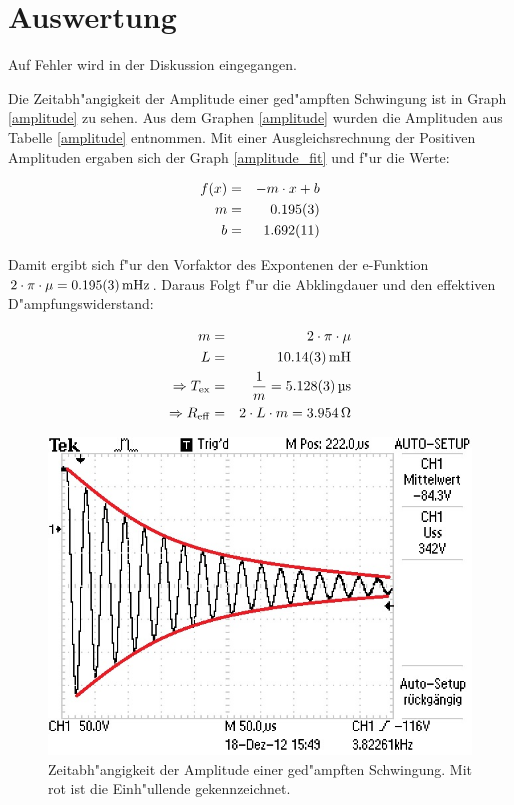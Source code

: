 \section{Auswertung}
	\label{sec:auswertung}
	

	Auf Fehler wird in der Diskussion eingegangen.

	Die Zeitabh"angigkeit der Amplitude einer ged"ampften Schwingung ist in Graph \eqref{amplitude} zu sehen.
	Aus dem Graphen \eqref{amplitude} wurden die Amplituden aus Tabelle \eqref{amplitude} entnommen. Mit einer Ausgleichsrechnung der Positiven Amplituden ergaben sich der Graph \eqref{amplitude_fit} und f"ur die Werte:

	\begin{eqnarray}
		f(x) &=& -m \cdot x + b\\ \label{ausgleich}
		m &=& \SI{0.195 (3)}{} \nonumber\\
		b &=& \SI{1.692 (11)}{}\nonumber 
	\end{eqnarray}

	Damit ergibt sich f"ur den Vorfaktor des Expontenen der e-Funktion $2\cdot \pi \cdot \mu  = \SI{0.195 (3)}{\milli\hertz}$.
	Daraus Folgt f"ur die Abklingdauer und den effektiven D"ampfungswiderstand:

	\begin{eqnarray*}
		m &=& 2 \cdot \pi \cdot \mu\\
		L &=& \SI{10.14 (3)}{\milli H}\\
		\Rightarrow T_\mathrm{ex} &=& \frac{1}{m} = \SI{5.128 (3)}{\micro \second}\\
		\Rightarrow R_\mathrm{eff} &=& 2 \cdot L \cdot m = \SI{3.954}{\ohm}
	\end{eqnarray*}

	\begin{figure}[htbp]
		\centering
		\includegraphics[width = 12cm]{img/F0006TEK.jpg}
		\caption{Zeitabh"angigkeit der Amplitude einer ged"ampften Schwingung. Mit rot ist die Einh"ullende gekennzeichnet.}
		\label{amplitude}
	\end{figure}


